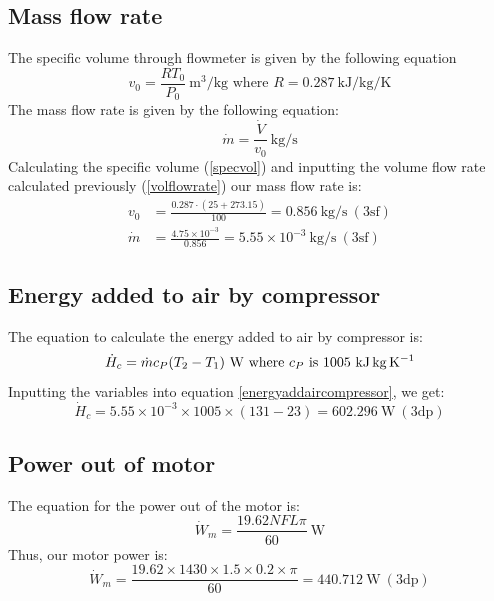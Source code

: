 \documentclass[class=article, crop=false, 12pt,a4paper]{standalone}
\numberwithin{equation}{section}
\begin{document}
\subsection{Mass flow rate}
The specific volume through flowmeter is given by the following equation
\begin{equation}
  v_0 = \frac{RT_0}{P_0} \ \si{\meter\cubed\per\kg} \textrm{ where \(R = 0.287 \ \si{\kilo\joule\per\kg\per\kelvin}\)}
  \label{specvol}
\end{equation}
The mass flow rate is given by the following equation:
\begin{equation}
  \dot{m} = \frac{\dot{V}}{v_0} \ \si{\kg\per\second}
  \label{massflowrate}
\end{equation}
Calculating the specific volume (\ref{specvol}) and inputting the volume flow rate calculated previously (\ref{volflowrate}) our mass flow rate is:
\begin{align} 
  v_0 &= \frac{0.287 \cdot (25+273.15)}{100} = 0.856 \ \si{\kg\per\second} \ (3\textrm{sf})  \\
  \dot{m} &= \frac{4.75 \times 10^{-3}}{0.856} = 5.55 \times 10^{-3} \ \si{\kg\per\second} \ (3\textrm{sf}) 
\end{align}
\subsection{Energy added to air by compressor}
The equation to calculate the energy added to air by compressor is:
\begin{equation}
  \dot{H}_c = \dot{m}c_P(T_2-T_1) \ \si{\watt} \textrm{ where \(c_P\) is 1005 \si{\kilo\joule\kg\per\kelvin}}
  \label{energyaddaircompressor}
\end{equation}
Inputting the variables into equation \ref{energyaddaircompressor}, we get: 
\begin{equation} 
  \dot{H}_c = 5.55 \times 10^{-3} \times 1005 \times (131-23) = 602.296 \ \si{\watt} \ (3\textrm{dp}) 
\end{equation}
\subsection{Power out of motor}
The equation for the power out of the motor is:
\begin{equation}
  \dot{W}_{m} = \frac{19.62NFL\pi}{60} \ \si{\watt}
  \label{motorpower}
\end{equation}
Thus, our motor power is:
\begin{equation} 
  \dot{W}_{m} = \frac{19.62 \times 1430 \times 1.5 \times 0.2 \times \pi}{60} = 440.712 \ \si{\watt} \ (3\textrm{dp})
\end{equation}
\end{document}
